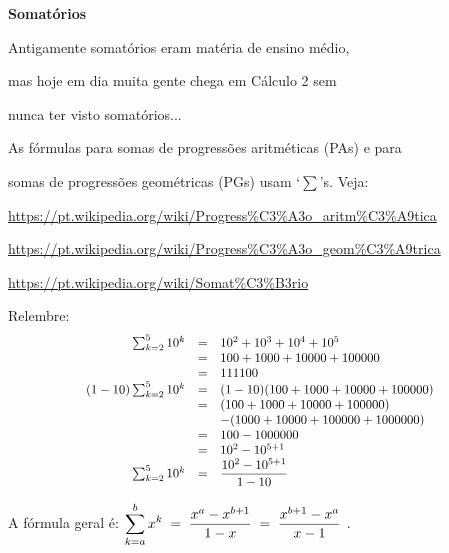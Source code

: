 \documentclass[oneside,12pt]{article}
\begin{document}
{\bf Somatórios}

Antigamente somatórios eram matéria de ensino médio,

mas hoje em dia muita gente chega em Cálculo 2 sem

nunca ter visto somatórios...

\ssk

As fórmulas para somas de progressões aritméticas (PAs) e para

somas de progressões geométricas (PGs) usam `$\sum$'s. Veja:

\bsk

{\footnotesize

\url{https://pt.wikipedia.org/wiki/Progress\%C3\%A3o_aritm\%C3\%A9tica}

\url{https://pt.wikipedia.org/wiki/Progress\%C3\%A3o_geom\%C3\%A9trica}

\url{https://pt.wikipedia.org/wiki/Somat\%C3\%B3rio}

}

\newpage


Relembre:
%
$$\scalebox{0.9}{$
  \begin{array}{rcl}
         \sum_{k=2}^{5} 10^k &=& 10^2 + 10^3 + 10^4 + 10^5 \\
                             &=& 100 + 1000 + 10000 + 100000 \\
                             &=& 111100 \\
  (1-10) \sum_{k=2}^{5} 10^k &=& (1-10)(100 + 1000 + 10000 + 100000) \\
                             &=& (100 + 1000 + 10000 + 100000) \\
                              && - (1000 + 10000 + 100000 + 1000000) \\
                             &=& 100 - 1000000 \\
                             &=& 10^2 - 10^{5+1} \\
         \sum_{k=2}^{5} 10^k &=& \D \frac{10^2 - 10^{5+1}}{1-10} \\
  \end{array}
  $}
$$

A fórmula geral é: \quad
%
$\displaystyle \sum_{k=a}^{b} x^k
 \; = \;
 \displaystyle \frac{x^a - x^{b+1}}{1 - x}
 \; = \;
 \displaystyle \frac{x^{b+1}- x^a}{x - 1}
$
\;.
\end{document}
